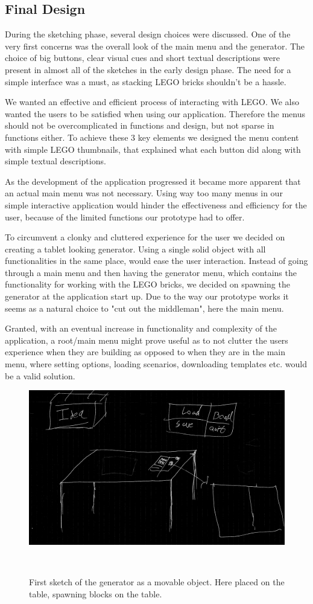 \subsection{Final Design}
During the sketching phase, several design choices were discussed. One of the very first concerns was the overall look of the main menu and the generator. The choice of big buttons, clear visual cues and short textual descriptions were present in almost all of the sketches in the early design phase. The need for a simple interface was a must, as stacking LEGO bricks shouldn't be a hassle. \par We wanted an effective and efficient process of interacting with LEGO. We also wanted the users to be satisfied when using our application. Therefore the menus should not be overcomplicated in functions and design, but not sparse in functions either. To achieve these 3 key elements we designed the menu content with simple LEGO thumbnails, that explained what each button did along with simple textual descriptions. \par
As the development of the application progressed it became more  apparent that an actual main menu was not necessary. Using way too many menus in our simple interactive application would hinder the effectiveness and efficiency for the user, because of the limited functions our prototype had to offer. \par To circumvent a clonky and cluttered experience for the user we decided on creating a tablet looking generator. Using a single solid object with all functionalities in the same place, would ease the user interaction. Instead of going through a main menu and then having the generator menu, which contains the functionality for working with the LEGO bricks, we decided on spawning the generator at the application start up. Due to the way our prototype works it seems as a natural choice to "cut out the middleman", here the main menu.  \par Granted, with an eventual increase in functionality and complexity of the application, a root/main menu might prove useful as to not clutter the users experience when they are building as opposed to when they are in the main menu, where setting options, loading scenarios, downloading templates etc. would be a valid solution.\par
\begin{figure}[t]
	\centering
	\includegraphics[width=0.7\columnwidth]{figures/Generator/gen6.png}
	\caption{First sketch of the generator as a movable object. Here placed on the table, spawning blocks on the table.}~\label{fig:finaldesign}
\end{figure}
